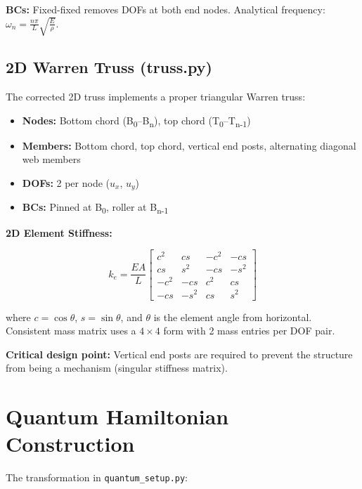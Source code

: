 \documentclass[12pt, a4paper]{article}
\begin{document}
\textbf{BCs:} Fixed-fixed removes DOFs at both end nodes. Analytical frequency: $\omega_n = \frac{n\pi}{L}\sqrt{\frac{E}{\rho}}$.

\subsection{2D Warren Truss (truss.py)}

The corrected 2D truss implements a proper triangular Warren truss:

\begin{itemize}[noitemsep]
    \item \textbf{Nodes:} Bottom chord (B\textsubscript{0}--B\textsubscript{n}), top chord (T\textsubscript{0}--T\textsubscript{n-1})
    \item \textbf{Members:} Bottom chord, top chord, vertical end posts, alternating diagonal web members
    \item \textbf{DOFs:} 2 per node ($u_x$, $u_y$)
    \item \textbf{BCs:} Pinned at B\textsubscript{0}, roller at B\textsubscript{n-1}
\end{itemize}

\textbf{2D Element Stiffness:}

\begin{equation}
k_e = \frac{EA}{L}
\begin{bmatrix}
c^2 & cs & -c^2 & -cs \\
cs & s^2 & -cs & -s^2 \\
-c^2 & -cs & c^2 & cs \\
-cs & -s^2 & cs & s^2
\end{bmatrix}
\end{equation}

where $c = \cos\theta$, $s = \sin\theta$, and $\theta$ is the element angle from horizontal. Consistent mass matrix uses a $4\times4$ form with 2 mass entries per DOF pair.

\textbf{Critical design point:} Vertical end posts are required to prevent the structure from being a mechanism (singular stiffness matrix).

\section{Quantum Hamiltonian Construction}

The transformation in \texttt{quantum\_setup.py}:
\end{document}

